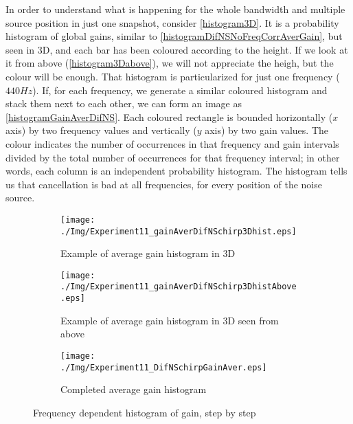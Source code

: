 In order to understand what is happening for the whole bandwidth and multiple source position in just one snapshot, consider \autoref{histogram3D}. It is a probability histogram of global gains, similar to \autoref{histogramDifNSNoFreqCorrAverGain}, but seen in 3D, and each bar has been coloured according to the height. If we look at it from above (\autoref{histogram3Dabove}), we will not appreciate the heigh, but the colour will be enough.
That histogram is particularized for just one frequency ($440\si{Hz}$). If, for each frequency, we generate a similar coloured histogram and stack them next to each other, we can form an image as \autoref{histogramGainAverDifNS}. %
Each coloured rectangle is bounded horizontally ($x$ axis) by two frequency values and vertically ($y$ axis) by two gain values. The colour indicates the number of occurrences in that frequency and gain intervals divided by the total number of occurrences for that frequency interval;
in other words, each column is an independent probability histogram. The histogram tells us that cancellation is bad at all frequencies, for every position of the noise source.

\begin{figure}[h]
	\centering
	\begin{subfigure}[b]{0.49\textwidth}
	\centering
	\texttt{[image: ./Img/Experiment11\_gainAverDifNSchirp3Dhist.eps]}
	\caption{Example of average gain histogram in 3D}
	\label{histogram3D}
	\end{subfigure}
	\begin{subfigure}[b]{0.49\textwidth}
		\centering
		\texttt{[image: ./Img/Experiment11\_gainAverDifNSchirp3DhistAbove.eps]}
		\caption{Example of average gain histogram in 3D seen from above}
		\label{histogram3Dabove}
	\end{subfigure}
	\begin{subfigure}[b]{0.49\textwidth}
		\centering	\texttt{[image: ./Img/Experiment11\_DifNSchirpGainAver.eps]}
		\caption{Completed average gain histogram}
		\label{histogramGainAverDifNS}
	\end{subfigure}
\caption{Frequency dependent histogram of gain, step by step}
\end{figure}

